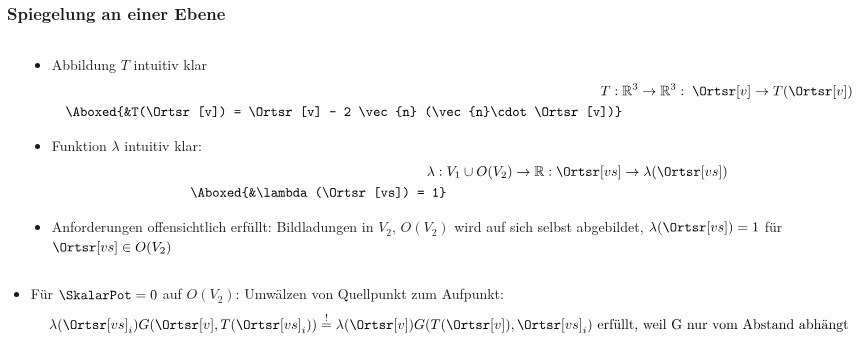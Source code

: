 \begin{frame}
  \frametitle{Spiegelung an einer Ebene}
  \begin{columns}
    \begin{column}{.3\textwidth}
\end{column}
\begin{column}{.65\textwidth}
  \begin{itemize}[<+->]
  \item Abbildung $T$ intuitiv klar
    \begin{align*}
      T:\; &\mathbb{R}^3 \to \mathbb{R}^3: \; \Ortsr[v] \to T(\Ortsr[v]) \nonumber\\
      \Aboxed{&T(\Ortsr[v]) = \Ortsr[v] - 2 \vec{n} (\vec{n}\cdot \Ortsr[v])}
    \end{align*}
  \item Funktion $\lambda$ intuitiv klar:
    \begin{align*}
      \lambda:\; &V_1\cup O(V_2) \to \mathbb{R}: \Ortsr[vs] \to \lambda(\Ortsr[vs])\nonumber\\
      \Aboxed{&\lambda(\Ortsr[vs]) = 1}
    \end{align*}
    \item Anforderungen offensichtlich erfüllt: Bildladungen in $V_2$, $O(V_2)$ wird auf sich selbst abgebildet, $\lambda(\Ortsr[vs]) = 1$ für $\Ortsr[vs] \in O(V_2)$ 
    \end{itemize}
  \end{column}
\end{columns}
\pause
\begin{itemize}
\item Für $\SkalarPot = 0$ auf $O(V_2)$: Umwälzen von Quellpunkt zum Aufpunkt:
  \begin{equation*}
    \lambda(\Ortsr[vs]_i) G(\Ortsr[v],T(\Ortsr[vs]_i)) \stackrel{!}{=}  \lambda(\Ortsr[v]) G(T(\Ortsr[v]),\Ortsr[vs]_i) \text{ erfüllt, weil G nur vom Abstand abhängt}
    \end{equation*}
  \end{itemize}
\end{frame}

